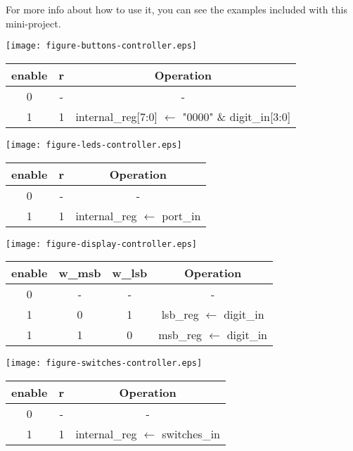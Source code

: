 \documentclass[10pt,a4paper,onecolumn]{article}
\begin{document}
For more info about how to use it, you can see the examples included with this 
mini-project.
\begin{center}

  \texttt{[image: figure-buttons-controller.eps]}
  \label{fig:unitbuttons}
\bigskip 
  \centering
  \begin{tabular}{|c|c|c|}
  \hline 
  enable & r & Operation \\ 
  \hline 
  \hline 
  0 & - & - \\ 
  \hline 
  1 & 1  & internal\_reg[7:0] ${\leftarrow}$ "0000" \& digit\_in[3:0] \\
  \hline 
  \end{tabular}
\bigskip 
  
  \texttt{[image: figure-leds-controller.eps]}
  \label{fig:unit-leds}
\bigskip 
  \centering
  \begin{tabular}{|c|c|c|}
  \hline 
  enable & r & Operation \\ 
  \hline 
  \hline 
  0 & - & - \\ 
  \hline 
  1 & 1  & internal\_reg ${\leftarrow}$ port\_in \\
  \hline 
  \end{tabular}
  \bigskip 
  
  

  \texttt{[image: figure-display-controller.eps]}
  \label{fig:unit-display}

  \bigskip 
  \centering
  \begin{tabular}{|c|c|c|c|}
  \hline 
  enable & w\_msb & w\_lsb & Operation \\ 
  \hline 
  \hline 
  0 & - & - & - \\ 
  \hline 
  1 & 0 & 1 & lsb\_reg ${\leftarrow}$ digit\_in \\ 
  \hline 
  1 & 1 & 0 & msb\_reg ${\leftarrow}$ digit\_in \\ 
  \hline 
  \end{tabular}
  
  \bigskip 
  \texttt{[image: figure-switches-controller.eps]}
  \label{fig:unit-switches}
\bigskip 
  \centering
  \begin{tabular}{|c|c|c|}
  \hline 
  enable & r & Operation \\ 
  \hline 
  \hline 
  0 & - & - \\ 
  \hline 
  1 & 1  & internal\_reg ${\leftarrow}$ switches\_in \\
  \hline 
  \end{tabular}


\end{center}
\end{document}
